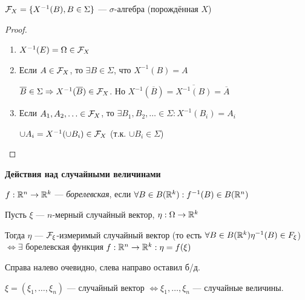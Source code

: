 \begin{statement}
$\mathcal{F}_X = \{X^{-1}(B), B \in \Sigma\}$ --- $\sigma$-алгебра (порождённая $X$)
\end{statement}
\begin{proof}
\,\newline
\begin{enumerate}
    \item $X^{-1}(E) = \Omega \in \mathcal{F}_X$
    
    \item Если $A \in \mathcal{F}_X$, то $\exists B \in \Sigma$, что $X^{-1}(B) = A$
    
    $\overline{B} \in \Sigma \Rightarrow X^{-1}(\overline{B}) \in \mathcal{F}_X$. Но $X^{-1}(\overline{B}) = \overline{X^{-1}(B)} = \overline{A}$
    
    \item Если $A_1, A_2, \ldots \in \mathcal{F}_X$, то $\exists B_1, B_2, \ldots \in \Sigma: X^{-1}(B_i) = A_i$
    
    $\cup A_i = X^{-1}(\cup B_i) \in \mathcal{F}_X$ (т.к. $\cup B_i \in \Sigma$)
\end{enumerate}
\end{proof}

\textbf{Действия над случайными величинами}

\begin{definition}
$f: \mathbb{R}^n \to \mathbb{R}^k$ --- \textit{борелевская}, если $\forall B \in B(\mathbb{R}^k) : f^{-1}(B) \in B(\mathbb{R}^n)$
\end{definition}

\begin{theorem}
Пусть $\xi$ --- $n$-мерный случайный вектор, $\eta : \Omega \to \mathbb{R}^k$

Тогда $\eta $ --- $\mathcal{F}_{\xi}$-измеримый случайный вектор (то есть $\forall B \in B(\mathbb{R}^k) \eta^{-1}(B) \in F_{\xi}$) $\Leftrightarrow \exists$ борелевская функция $f : \mathbb{R}^n \to \mathbb{R}^k : \eta = f(\xi)$
\end{theorem}

Справа налево очевидно, слева направо оставил б/д.

\begin{statement}
$\xi = (\xi_1, \ldots, \xi_n)$ --- случайный вектор $\Leftrightarrow \xi_1, \ldots, \xi_n$ --- случайные величины.
\end{statement}

